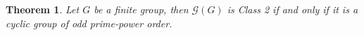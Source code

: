 \documentclass{article}
\newtheorem{theorem}{Theorem}[section]
\theoremstyle{definition}
\theoremstyle{indentclaim}
\theoremstyle{named}
\theoremstyle{named}
\begin{document}
\begin{theorem}\label{thm:pg-class2}
    Let $G$ be a finite group, then $\mathscr{G}(G)$ is Class 2 if and only if it is a cyclic group of odd prime-power order. 
\end{theorem}

\end{document}
